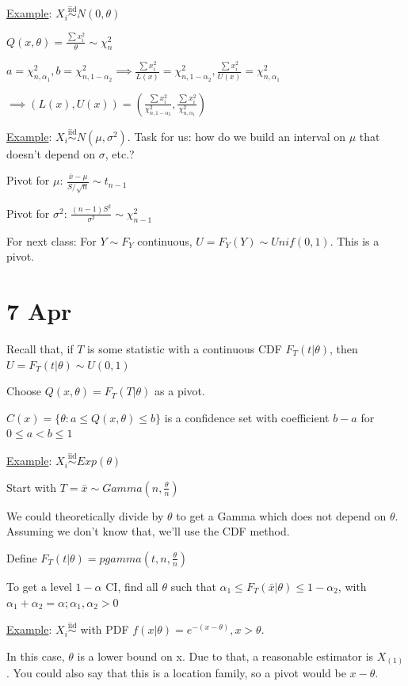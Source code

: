 \documentclass{article}
\let\Oldsum=\sum
\renewcommand{\sum}{\Oldsum\limits}
\newcommand{\iiddist}{\overset{\mathrm{iid}}{\sim}}
\begin{document}
\underline{Example}: $X_i \iiddist N(0,\theta)$

$Q(x,\theta) = \frac{\sum x_i^2}{\theta} \sim \chi^2_n$

$a = \chi^2_{n,\alpha_1}, b = \chi^2_{n,1-\alpha_2} \implies \frac{\sum x_i^2}{L(x)} = \chi^2_{n,1-\alpha_2}, \frac{\sum x_i^2}{U(x)} = \chi^2_{n,\alpha_1}$

$\implies (L(x), U(x)) = \left( \frac{\sum x_i^2}{\chi^2_{n,1-\alpha_2}}, \frac{\sum x_i^2}{\chi^2_{n,\alpha_1}} \right)$

\underline{Example}: $X_i \iiddist N(\mu, \sigma^2)$. Task for us: how do we build an interval on $\mu$ that doesn't depend on $\sigma$, etc.?

Pivot for $\mu$: $\frac{\bar{x} - \mu}{S/\sqrt{n}} \sim t_{n-1}$

Pivot for $\sigma^2$: $\frac{(n-1)S^2}{\sigma^2} \sim \chi^2_{n-1}$

For next class: For $Y \sim F_Y$ continuous, $U = F_Y(Y) \sim Unif(0,1)$. This is a pivot. 

\section{7 Apr}

Recall that, if $T$ is some statistic with a continuous CDF $F_T (t|\theta)$, then $U = F_T (t|\theta) \sim U(0,1)$

Choose $Q(x,\theta) = F_T (T|\theta)$ as a pivot. 

$C(x) = \{ \theta: a \le Q(x,\theta) \le b\}$ is a confidence set with coefficient $b-a$ for $0 \le a < b \le 1$

\underline{Example}: $X_i \iiddist Exp(\theta)$ 

Start with $T = \bar{x} \sim Gamma(n, \frac{\theta}{n})$

We could theoretically divide by $\theta$ to get a Gamma which does not depend on $\theta$. Assuming we don't know that, we'll use the CDF method. 

Define $F_T(t|\theta) = pgamma(t,n,\frac{\theta}{n})$

To get a level $1-\alpha$ CI, find all $\theta$ such that $\alpha_1 \le F_T(\bar{x}|\theta) \le 1-\alpha_2$, with $\alpha_1 + \alpha_2 = \alpha; \alpha_1,\alpha_2 > 0$

\underline{Example}: $X_i \iiddist$ with PDF $f(x|\theta) = e^{-(x-\theta)}, x > \theta$. 

In this case, $\theta$ is a lower bound on x. Due to that, a reasonable estimator is $X_{(1)}$. You could also say that this is a location family, so a pivot would be $x-\theta$.
\end{document}
